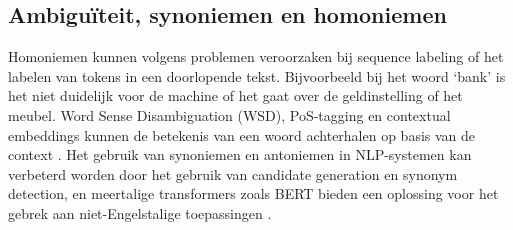 
\subsection{Ambiguïteit, synoniemen en homoniemen}

Homoniemen kunnen volgens \textcite{Roldos2020} problemen veroorzaken bij sequence labeling of het labelen van tokens in een doorlopende tekst. Bijvoorbeeld bij het woord ‘bank’ is het niet duidelijk voor de machine of het gaat over de geldinstelling of het meubel. Word Sense Disambiguation (WSD), PoS-tagging en contextual embeddings kunnen de betekenis van een woord achterhalen op basis van de context \autocite{Eisenstein2019, Liu2020}. Het gebruik van synoniemen en antoniemen in NLP-systemen kan verbeterd worden door het gebruik van candidate generation en synonym detection, en meertalige transformers zoals BERT bieden een oplossing voor het gebrek aan niet-Engelstalige toepassingen \autocite{Dandekar2016, Roldos2020}.



